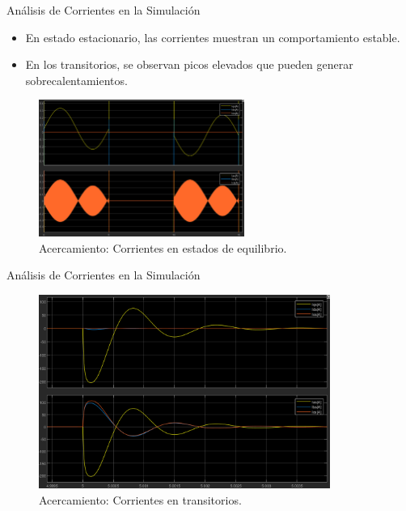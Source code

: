 \documentclass[12pt]{beamer}
\begin{document}
\begin{frame}{Análisis de Corrientes en la Simulación}
    \begin{itemize}
        \item En estado estacionario, las corrientes muestran un comportamiento estable.
        \item En los transitorios, se observan picos elevados que pueden generar sobrecalentamientos.
    \end{itemize}
    \begin{figure}[H]
        \centering
        \includegraphics[width=0.6\textwidth]{Imagenes/AcercamientoCorrientesEstacionariasSimulacion.png}
        \caption{Acercamiento: Corrientes en estados de equilibrio.}
    \end{figure}
\end{frame}

\begin{frame}{Análisis de Corrientes en la Simulación}
    \begin{figure}[H]
        \centering
        \includegraphics[width=0.85\textwidth]{Imagenes/AcercamientoCorrientesTransitoriosSimulacion.png}
        \caption{Acercamiento: Corrientes en transitorios.}
    \end{figure}
\end{frame}
\end{document}
